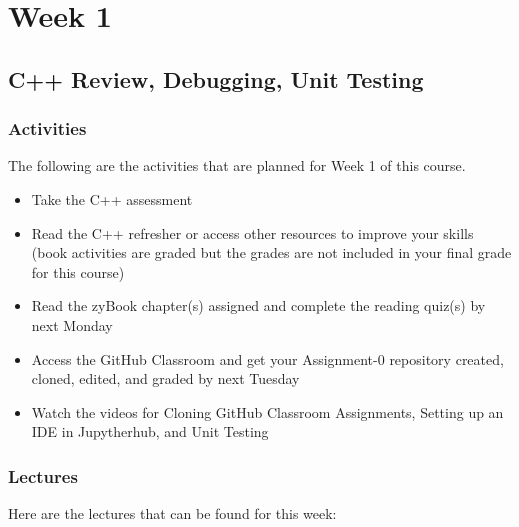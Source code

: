 \clearpage

\newcommand{\ChapTitle}{Week 1}
\newcommand{\SectionTitle}{C++ Review, Debugging, Unit Testing}

\chapter{\ChapTitle}

\section{\SectionTitle}

\subsection{Activities}

The following are the activities that are planned for Week 1 of this course.

\begin{itemize}
    \item Take the C++ assessment
    \item Read the C++ refresher or access other resources to improve your skills (book activities are graded but the grades are not included in your final grade for this course)
    \item Read the zyBook chapter(s) assigned and complete the reading quiz(s) by next Monday
    \item Access the GitHub Classroom and get your Assignment-0 repository created, cloned, edited, and graded by next Tuesday
    \item Watch the videos for Cloning GitHub Classroom Assignments, Setting up an IDE in Jupytherhub, and Unit Testing
\end{itemize}

\subsection{Lectures}

Here are the lectures that can be found for this week:


